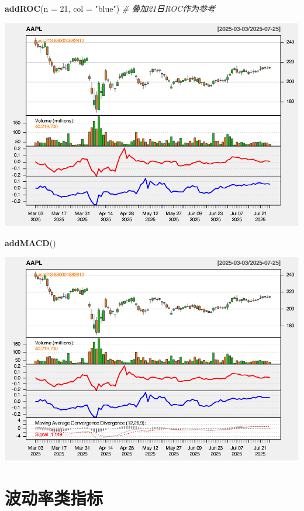\documentclass[]{ctexbook}
\newenvironment{Shaded}{\begin{snugshade}}{\end{snugshade}}
\newcommand{\AttributeTok}[1]{\textcolor[rgb]{0.13,0.29,0.53}{#1}}
\newcommand{\CommentTok}[1]{\textcolor[rgb]{0.56,0.35,0.01}{\textit{#1}}}
\newcommand{\DecValTok}[1]{\textcolor[rgb]{0.00,0.00,0.81}{#1}}
\newcommand{\FunctionTok}[1]{\textcolor[rgb]{0.13,0.29,0.53}{\textbf{#1}}}
\newcommand{\NormalTok}[1]{#1}
\newcommand{\StringTok}[1]{\textcolor[rgb]{0.31,0.60,0.02}{#1}}
\begin{document}
\begin{Shaded}
\begin{Highlighting}[]
\FunctionTok{addROC}\NormalTok{(}\AttributeTok{n =} \DecValTok{21}\NormalTok{, }\AttributeTok{col =} \StringTok{"blue"}\NormalTok{)  }\CommentTok{\# 叠加21日ROC作为参考 }
\end{Highlighting}
\end{Shaded}

\includegraphics[width=0.9\linewidth]{QuantmodHandbook_files/figure-latex/roc_2-3}

\begin{Shaded}
\begin{Highlighting}[]
\FunctionTok{addMACD}\NormalTok{()}
\end{Highlighting}
\end{Shaded}

\includegraphics[width=0.9\linewidth]{QuantmodHandbook_files/figure-latex/roc_2-4}

\section{波动率类指标}\label{ux6ce2ux52a8ux7387ux7c7bux6307ux6807}
\end{document}
